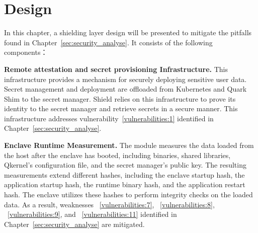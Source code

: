 \chapter{Design}
\label{sec:design}





In this chapter, a shielding layer design will be presented to mitigate the pitfalls found in Chapter~\ref{sec:security_analyse}. It consists of the following components：

\textbf{Remote attestation and secret provisioning Infrastructure.} This infrastructure provides a mechanism for securely deploying sensitive user data. Secret management and deployment are offloaded from Kubernetes and Quark Shim to the secret manager. Shield relies on this infrastructure to prove its 
identity to the secret manager and retrieve secrets in a secure manner. This infrastructure addresses vulnerability~\ref{vulnerabilities:1} identified in Chapter~\ref{sec:security_analyse}.

\textbf{Enclave Runtime Measurement.} The module measures the data loaded from the host after the enclave has booted, including binaries, shared libraries, Qkernel's configuration file, and the secret manager's public key. The resulting measurements extend different hashes, including the enclave startup hash, the application startup hash, the runtime binary hash, and 
the application restart hash. The enclave utilizes these hashes to perform integrity checks on the loaded data. As a result, weaknesses ~\ref{vulnerabilities:7}, ~\ref{vulnerabilities:8}, ~\ref{vulnerabilities:9}, and ~\ref{vulnerabilities:11} identified in Chapter~\ref{sec:security_analyse} are mitigated.
 

